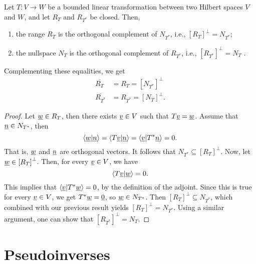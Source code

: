 \begin{theorem}
Let $T : V \rightarrow W$ be a bounded linear transformation between two Hilbert spaces $V$ and $W$, and let $R_T$ and $R_{T^*}$ be closed.
Then,
\begin{enumerate}
\item the range $R_T$ is the orthogonal complement of $N_{T^*}$, i.e., $\left[ R_T \right]^{\bot} = N_{T^*}$;
\item the nullspace $N_T$ is the orthogonal complement of $R_{T^*}$, i.e., $\left[ R_{T^*} \right]^{\bot} = N_T$ .
\end{enumerate}
Complementing these equalities, we get
\begin{align*}
\overline{R_T} &= R_T = \left[ N_{T^*} \right]^{\bot} \\
\overline{R_{T^*}} &= R_{T^*} = \left[ N_T \right]^{\bot} .
\end{align*}
\end{theorem}
\begin{proof}
Let $\underline{w} \in R_T$, then there exists $\underline{v} \in V$ such that $T \underline{v} = \underline{w}$.
Assume that $\underline{n} \in N_{T^*}$, then
\begin{equation*}
\left\langle \underline{w} | \underline{n} \right\rangle
= \left\langle T \underline{v} | \underline{n} \right\rangle
= \left\langle \underline{v} | T^* \underline{n} \right\rangle
= 0 .
\end{equation*}
That is, $\underline{w}$ and $\underline{n}$ are orthogonal vectors.
It follows that $N_{T^*} \subseteq \left[ R_T \right]^{\bot}$.
Now, let $\underline{w} \in \left[ R_T \right]^{\bot}$.
Then, for every $\underline{v} \in V$, we have
\begin{equation*}
\left\langle T \underline{v} | \underline{w} \right\rangle = 0.
\end{equation*}
This implies that $\left\langle \underline{v} | T^* \underline{w} \right\rangle = 0$, by the definition of the adjoint.
Since this is true for every $\underline{v} \in V$, we get $T^* \underline{w} = \underline{0}$, so $\underline{w} \in N_{T^*}$.
Then $\left[ R_T \right]^{\bot} \subseteq N_{T^*}$, which combined with our previous result yields $\left[ R_T \right]^{\bot} = N_{T^*}$.
Using a similar argument, one can show that $\left[ R_{T^*} \right]^{\bot} = N_T$.
\end{proof}


\section{Pseudoinverses}

